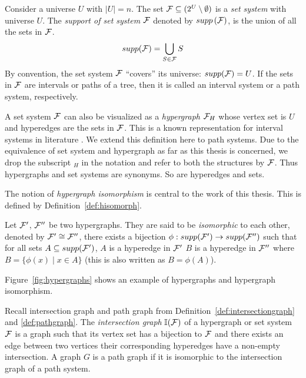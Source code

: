 Consider a universe $U$ with $|U| = n$.  The set ${\mathcal F} \subseteq (2^{U}
\setminus \emptyset)$ is a {\em set system} with universe $U$.  The
{\em support of set system} ${\mathcal F}$ denoted by $supp\left({\cal F}\right)$, is the union
of all the sets in ${\mathcal F}$.
\[supp({\mathcal F}) = \bigcup_{S \in {\mathcal F}}S\]%
By convention, the set system ${\cal F}$ ``covers'' its universe:
$supp({\cal F}) = U$. If the sets in ${\cal F}$ are intervals or paths of a
tree, then it is called an interval system or a path system,
respectively.
\par
A set system ${\cal F}$ can also be visualized as a {\em hypergraph}
${\cal F}_H$ whose vertex set is $U$ and hyperedges are the sets in
${\cal F}$. This is a known representation for interval systems in
literature \cite{bls99,kklv10}.  We extend this definition here to
path systems. Due to the equivalence of set system and hypergraph as
far as this thesis is concerned, we drop the subscript $_H$ in the
notation and refer to both the structures by ${\cal F}$. Thus hypergraphs
and set systems are synonyms. So are hyperedges and sets.
\par
The notion of {\em hypergraph isomorphism} is central to the work of
this thesis. This is defined by Definition~\ref{def:hisomorph}.

\begin{definition}
  \label{def:hisomorph}
  Let ${\cal F}'$, ${\cal F}''$ be two hypergraphs.  They are said to be {\em
    isomorphic} to each other, denoted by ${\cal F}' \cong {\cal F}''$, \iff
  there exists a bijection $\phi: supp({\cal F}') \rightarrow supp({\cal F}'')$
  such that for all sets $A \subseteq supp({\cal F}')$, $A$ is a hyperedge
  in ${\cal F}'$ \iff $B$ is a hyperedge in ${\cal F}''$ where $B = \{\phi(x)
  \mid x \in A\}$ (this is also written as $B=\phi(A)$).
\end{definition}

Figure~\ref{fig:hypergraphs} shows an example of hypergraphs and
hypergraph isomorphism.

Recall intersection graph and path graph from
Definition~\ref{def:intersectiongraph} and \ref{def:pathgraph}. The
{\em intersection graph} $\mathbb I({\cal F})$ of a hypergraph or set system
${\cal F}$ is a graph such that its vertex set has a bijection to ${\cal F}$ and
there exists an edge between two vertices \iff their corresponding
hyperedges have a non-empty intersection. A graph $G$ is a path graph
if it is isomorphic to the intersection graph of a path system.

